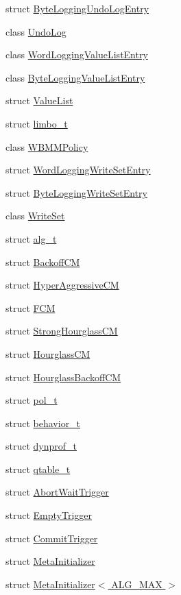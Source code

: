 \begin{DoxyCompactItemize}
struct \hyperlink{structstm_1_1ByteLoggingUndoLogEntry}{Byte\-Logging\-Undo\-Log\-Entry}
\item 
class \hyperlink{classstm_1_1UndoLog}{Undo\-Log}
\item 
class \hyperlink{classstm_1_1WordLoggingValueListEntry}{Word\-Logging\-Value\-List\-Entry}
\item 
class \hyperlink{classstm_1_1ByteLoggingValueListEntry}{Byte\-Logging\-Value\-List\-Entry}
\item 
struct \hyperlink{structstm_1_1ValueList}{Value\-List}
\item 
struct \hyperlink{structstm_1_1limbo__t}{limbo\-\_\-t}
\item 
class \hyperlink{classstm_1_1WBMMPolicy}{W\-B\-M\-M\-Policy}
\item 
struct \hyperlink{structstm_1_1WordLoggingWriteSetEntry}{Word\-Logging\-Write\-Set\-Entry}
\item 
struct \hyperlink{structstm_1_1ByteLoggingWriteSetEntry}{Byte\-Logging\-Write\-Set\-Entry}
\item 
class \hyperlink{classstm_1_1WriteSet}{Write\-Set}
\item 
struct \hyperlink{structstm_1_1alg__t}{alg\-\_\-t}
\item 
struct \hyperlink{structstm_1_1BackoffCM}{Backoff\-C\-M}
\item 
struct \hyperlink{structstm_1_1HyperAggressiveCM}{Hyper\-Aggressive\-C\-M}
\item 
struct \hyperlink{structstm_1_1FCM}{F\-C\-M}
\item 
struct \hyperlink{structstm_1_1StrongHourglassCM}{Strong\-Hourglass\-C\-M}
\item 
struct \hyperlink{structstm_1_1HourglassCM}{Hourglass\-C\-M}
\item 
struct \hyperlink{structstm_1_1HourglassBackoffCM}{Hourglass\-Backoff\-C\-M}
\item 
struct \hyperlink{structstm_1_1pol__t}{pol\-\_\-t}
\item 
struct \hyperlink{structstm_1_1behavior__t}{behavior\-\_\-t}
\item 
struct \hyperlink{structstm_1_1dynprof__t}{dynprof\-\_\-t}
\item 
struct \hyperlink{structstm_1_1qtable__t}{qtable\-\_\-t}
\item 
struct \hyperlink{structstm_1_1AbortWaitTrigger}{Abort\-Wait\-Trigger}
\item 
struct \hyperlink{structstm_1_1EmptyTrigger}{Empty\-Trigger}
\item 
struct \hyperlink{structstm_1_1CommitTrigger}{Commit\-Trigger}
\item 
struct \hyperlink{structstm_1_1MetaInitializer}{Meta\-Initializer}
\item 
struct \hyperlink{structstm_1_1MetaInitializer_3_01ALG__MAX_01_4}{Meta\-Initializer$<$ A\-L\-G\-\_\-\-M\-A\-X $>$}
\end{DoxyCompactItemize}

